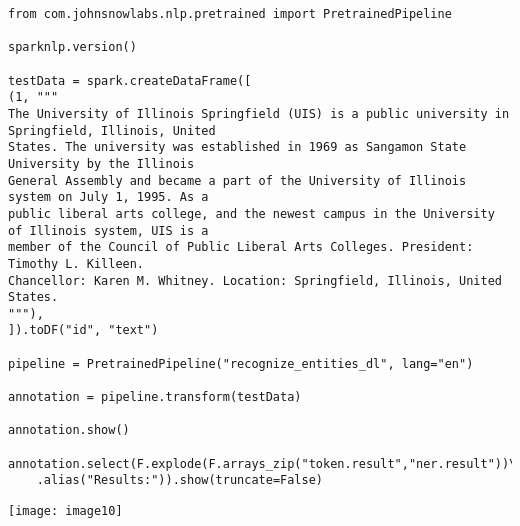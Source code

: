 \documentclass[]{article}
\begin{document}
\begin{verbatim}
from com.johnsnowlabs.nlp.pretrained import PretrainedPipeline

sparknlp.version()

testData = spark.createDataFrame([
(1, """
The University of Illinois Springfield (UIS) is a public university in Springfield, Illinois, United 
States. The university was established in 1969 as Sangamon State University by the Illinois 
General Assembly and became a part of the University of Illinois system on July 1, 1995. As a 
public liberal arts college, and the newest campus in the University of Illinois system, UIS is a 
member of the Council of Public Liberal Arts Colleges. President: Timothy L. Killeen.
Chancellor: Karen M. Whitney. Location: Springfield, Illinois, United States.
"""),
]).toDF("id", "text")

pipeline = PretrainedPipeline("recognize_entities_dl", lang="en")

annotation = pipeline.transform(testData)

annotation.show()

annotation.select(F.explode(F.arrays_zip("token.result","ner.result"))\
	.alias("Results:")).show(truncate=False)
\end{verbatim}
\texttt{[image: image10]} %
\end{document}
